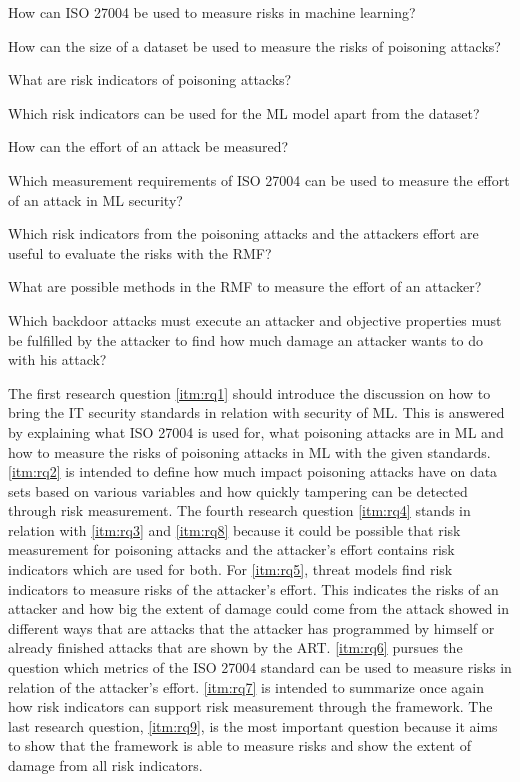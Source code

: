 \begin{questions}
  \item How can ISO 27004 be used to measure risks in machine learning? \label{itm:rq1}
  \item How can the size of a dataset be used to measure the risks of poisoning attacks? \label{itm:rq2}
  \item What are risk indicators of poisoning attacks? \label{itm:rq3}
  \item Which risk indicators can be used for the ML model apart from the dataset? \label{itm:rq4}
  \item How can the effort of an attack be measured? \label{itm:rq5}
  \item Which measurement requirements of ISO 27004 can be used to measure the effort of an attack in ML security? \label{itm:rq6}
  \item Which risk indicators from the poisoning attacks and the attackers effort are useful to evaluate the risks with the RMF? \label{itm:rq7}
  \item What are possible methods in the RMF to measure the effort of an attacker? \label{itm:rq8}
  \item Which backdoor attacks must execute an attacker and objective properties must be fulfilled by the attacker to find how much damage an attacker wants to do with his attack?
  \label{itm:rq9}
\end{questions}

The first research question \ref{itm:rq1} should introduce the discussion on how to bring the IT security standards in relation with security of ML. This is answered by explaining what ISO
27004 is used for, what poisoning attacks are in ML and how to measure the risks of poisoning attacks in ML with the given standards. \ref{itm:rq2} is intended to define how much
impact poisoning attacks have on data sets based on various variables and how quickly tampering can be detected through risk measurement. The fourth research question \ref{itm:rq4} stands in relation with \ref{itm:rq3} and \ref{itm:rq8} because it could be possible that risk measurement for poisoning attacks and the attacker's effort contains risk indicators which are used for both. For \ref{itm:rq5}, threat models find risk indicators to measure risks of the attacker's effort. This indicates the risks of an attacker and how big the extent of damage could come from the attack showed in different ways that are attacks that the attacker has programmed by himself or already finished attacks that are shown by the ART. \ref{itm:rq6} pursues the question which metrics of the ISO 27004 standard can be used to measure risks in relation of the attacker's effort. \ref{itm:rq7} is intended to summarize once again how risk indicators can support risk measurement through the framework. The last research question, \ref{itm:rq9}, is the most important question because it aims to show that the framework is able to measure risks and show the extent of damage from all risk indicators.
